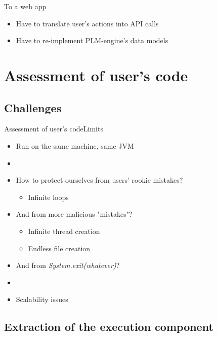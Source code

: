 \documentclass{beamer}
\begin{document}
\begin{frame}{To a web app}
  \begin{itemize}
    \item Have to translate user's actions into API calls
    \item Have to re-implement PLM-engine's data models
  \end{itemize}
\end{frame}

\section{Assessment of user's code}

\subsection{Challenges}

\begin{frame}{Assessment of user's code}{Limits}
  \begin{itemize}
  \item {
    Run on the same machine, same JVM
    \pause
  }
  \item[~]
  \item {
    How to protect ourselves from users' rookie mistakes?
    \begin{itemize}
    \item {
      Infinite loops
    }
    \end{itemize}
    \pause
  }
  \item {
    And from more malicious "mistakes"?
    \begin{itemize}
    \item {
      Infinite thread creation
    }
    \item {
      Endless file creation
    }
    \end{itemize}
    \pause
  }
  \item {
    And from \emph{System.exit(whatever)}?
    \pause
  }
  \item[~]
  \item {
    Scalability issues
  }
  \end{itemize}
\end{frame}

\subsection{Extraction of the execution component}
\end{document}
